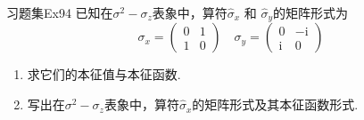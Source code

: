 \begin{question}{习题集Ex94}
    已知在$\sigma^2-\sigma_z$表象中，算符$\hat{\sigma}_x$ 和 $\hat{\sigma}_y$的矩阵形式为
    $$
        \sigma_x=\begin{pmatrix}
            0 & 1 \\
            1 & 0
        \end{pmatrix}
        \quad
        \sigma_y=\begin{pmatrix}
            0          & -\mathrm{i} \\
            \mathrm{i} & 0
        \end{pmatrix}
    $$
    \begin{enumerate}
        \item 求它们的本征值与本征函数.
        \item 写出在$\sigma^2-\sigma_z$表象中，算符$\hat{\sigma}_x$的矩阵形式及其本征函数形式.
    \end{enumerate}
\end{question}

